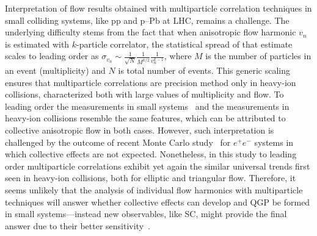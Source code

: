Interpretation of flow results obtained with multiparticle correlation techniques in small colliding systems, like pp and p--Pb at LHC, remains a challenge. The underlying difficulty stems from the fact that when anisotropic flow harmonic $v_n$ is estimated with $k$-particle correlator, the statistical spread of that estimate scales to leading order as $\sigma_{v_{n}}\sim\frac{1}{\sqrt{N}}\frac{1}{M^{k/2}}\frac{1}{v_{n}^{k-1}}$, where $M$ is the number of particles in an event (multiplicity) and $N$ is total number of events. This generic scaling ensures that multiparticle correlations are precision method only in heavy-ion collisions, characterized both with large values of multiplicity and flow. To leading order the measurements in small systems~\cite{Aad:2013fja,Abelev:2014mda,Khachatryan:2015waa,Adamczyk:2015xjc,Adare:2015ctn} and the measurements in heavy-ion collisions resemble the same features, which can be attributed to collective anisotropic flow in both cases. However, such interpretation is challenged by the outcome of recent Monte Carlo study~\cite{Loizides:2016tew} for $e^+e^-$ systems in which collective effects are not expected. Nonetheless, in this study to leading order multiparticle correlations exhibit yet again the similar universal trends first seen in heavy-ion collisions, both for elliptic and triangular flow. Therefore, it seems unlikely that the analysis of individual flow harmonics with multiparticle techniques will answer whether collective effects can develop and QGP be formed in small systems---instead new observables, like SC, might provide the final answer due to their better sensitivity~\cite{Niemi:2012aj,ALICE:2016kpq}.


